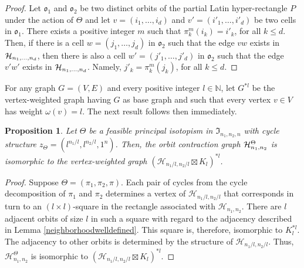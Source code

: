 \documentclass{article}
\newtheorem{prop}[thm]{Proposition}
\begin{document}
\begin{proof} Let $\mathfrak{o}_1$ and $\mathfrak{o}_2$ be two distinct orbits of the partial Latin hyper-rectangle $P$ under the action of $\Theta$ and let $v=(i_1,\ldots,i_d)$ and $v'=(i'_1,\ldots,i'_d)$ be two cells in $\mathfrak{o}_1$. There exists a positive integer $m$ such that $\pi^m_k(i_k)=i'_k$, for all $k\leq d$. Then, if there is a cell $w=(j_1,\ldots,j_d)$ in $\mathfrak{o}_2$ such that the edge $vw$ exists in ${\cal H}_{n_1,\ldots,n_d}$, then there is also a cell $w'=(j'_1,\ldots,j'_d)$ in $\mathfrak{o}_2$ such that the edge $v'w'$ exists in ${\cal H}_{n_1,\ldots,n_d}$. Namely, $j'_k=\pi^m_k(j_k)$, for all $k\leq d$.
\end{proof}

For any graph $G=(V,E)$ and every positive integer $l\in\mathbb{N}$, let $G^{\ast l}$ be the vertex-weighted graph having $G$ as base graph and such that every vertex $v\in V$ has weight $\omega(v)=l$. The next result follows then immediately.

\begin{prop}\label{alllcyclesstructure}
Let $\Theta$ be a feasible principal isotopism in $\mathfrak{I}_{n_1,n_2,n}$ with cycle structure $z_{\Theta}=\left(l^{n_1/l},l^{n_2/l},1^n\right)$. Then, the orbit contraction graph ${\cal H}_{n_1,n_2}^{\Theta}$ is isomorphic to the vertex-weighted graph $(\mathcal{H}_{n_1/l,n_2/l}\boxtimes K_l)^{\ast l}$.
\end{prop}

\begin{proof} Suppose $\Theta=(\pi_1,\pi_2,\pi)$. Each pair of cycles from the cycle decomposition of $\pi_1$ and $\pi_2$ determines a vertex of $\mathcal{H}_{n_1/l,n_2/l}$ that 
corresponds in turn to an $(l\times l)$-square in the rectangle associated with $\mathcal{H}_{n_1,n_2}$. There are $l$ adjacent orbits of size $l$ in such a square with regard to the 
adjacency described in Lemma 
\ref{neighborhoodwelldefined}. This square is, therefore, isomorphic to $K_l^{\ast l}$. The adjacency to other orbits is determined by the structure of $\mathcal{H}_{n_1/l,n_2/l}$. Thus, $\mathcal{H}_{n_1,n_2}^{\Theta}$ is isomorphic to $(\mathcal{H}_{n_1/l,n_2/l}\boxtimes K_l)^{\ast l}$.
\end{proof}
\end{document}
